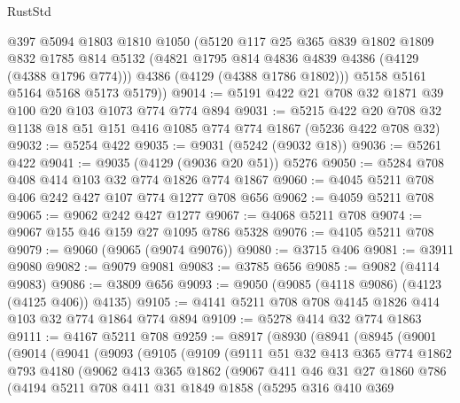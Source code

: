 \begin{lexlean}{RustStd}
\begin{coremodule}
{\begin{coremodule}
{{{{{{{{{{{{{{        @397
        @5094
        @1803
        @1810
        @1050
        (@5120
          @117
          @25
          @365
          @839
          @1802
          @1809
          @832
          @1785
          @814
          @5132
          (@4821 @1795 @814 @4836 @4839 @4386 (@4129 (@4388 @1796 @774)))
          @4386
          (@4129 (@4388 @1786 @1802)))
        @5158
        @5161
        @5164
        @5168
        @5173
        @5179))
@9014 := @5191 @422 @21 @708 @32 @1871 @39 @100 @20 @103 @1073 @774 @774 @894
@9031 := @5215 @422 @20 @708 @32 @1138 @18 @51 @151 @416 @1085 @774 @774 @1867 (@5236 @422 @708 @32)
@9032 := @5254 @422
@9035 := @9031 (@5242 (@9032 @18))
@9036 := @5261 @422
@9041 := @9035 (@4129 (@9036 @20 @51)) @5276
@9050 := @5284 @708 @408 @414 @103 @32 @774 @1826 @774 @1867
@9060 := @4045 @5211 @708 @406 @242 @427 @107 @774 @1277 @708 @656
@9062 := @4059 @5211 @708
@9065 := @9062 @242 @427 @1277
@9067 := @4068 @5211 @708
@9074 := @9067 @155 @46 @159 @27 @1095 @786 @5328
@9076 := @4105 @5211 @708
@9079 := @9060 (@9065 (@9074 @9076))
@9080 := @3715 @406
@9081 := @3911 @9080
@9082 := @9079 @9081
@9083 := @3785 @656
@9085 := @9082 (@4114 @9083)
@9086 := @3809 @656
@9093 := @9050 (@9085 (@4118 @9086) (@4123 (@4125 @406)) @4135)
@9105 := @4141 @5211 @708 @708 @4145 @1826 @414 @103 @32 @774 @1864 @774 @894
@9109 := @5278 @414 @32 @774 @1863
@9111 := @4167 @5211 @708
@9259 := @8917
    (@8930
      (@8941
        (@8945
          (@9001
            (@9014
              (@9041
                (@9093
                  (@9105
                    (@9109
                      (@9111
                        @51
                        @32
                        @413
                        @365
                        @774
                        @1862
                        @793
                        @4180
                        (@9062
                          @413
                          @365
                          @1862
                          (@9067
                            @411
                            @46
                            @31
                            @27
                            @1860
                            @786
                            (@4194
                              @5211
                              @708
                              @411
                              @31
                              @1849
                              @1858
                              (@5295
                                @316
                                @410
                                @369
}}}}}}}}}}}}}}
\end{coremodule}}
\end{coremodule}
\end{lexlean}
